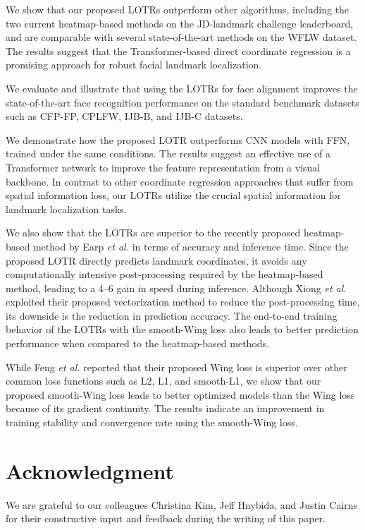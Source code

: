 \documentclass[journal]{IEEEtran}
\begin{document}
We show that our proposed LOTRs outperform other algorithms, including the two current heatmap-based methods on the JD-landmark challenge leaderboard, and are comparable with several state-of-the-art methods on the WFLW dataset.
The results suggest that the Transformer-based direct coordinate regression is a promising approach for robust facial landmark localization.

We evaluate and illustrate that using the LOTRs for face alignment improves the state-of-the-art face recognition performance on the standard benchmark datasets such as CFP-FP, CPLFW, IJB-B, and IJB-C datasets.

We demonstrate how the proposed LOTR outperforms CNN models with FFN, trained under the same conditions. 
The results suggest an effective use of a Transformer network to improve the feature representation from a visual backbone. 
In contrast to other coordinate regression approaches that suffer from spatial information loss, our LOTRs utilize the crucial spatial information for landmark localization tasks.

We also show that the LOTRs are superior to the recently proposed heatmap-based method by Earp \textit{et al.} \cite{earp2021sub} in terms of accuracy and inference time. 
Since the proposed LOTR directly predicts landmark coordinates, it avoids any computationally intensive post-processing required by the heatmap-based method, leading to a 4--6 gain in speed during inference. 
Although Xiong \textit{et al.} \cite{xiong2020} exploited their proposed vectorization method to reduce the post-processing time, its downside is the reduction in prediction accuracy.
The end-to-end training behavior of the LOTRs with the smooth-Wing loss also leads to better prediction performance when compared to the heatmap-based methods.

While Feng \textit{et al.} \cite{Feng2017} reported that their proposed Wing loss is superior over other common loss functions such as L2, L1, and smooth-L1, we show that our proposed smooth-Wing loss leads to better optimized models than the Wing loss because of its gradient continuity. 
The results indicate an improvement in training stability and convergence rate using the smooth-Wing loss. 





\section*{Acknowledgment}

We are grateful to our colleagues Christina Kim, Jeff Hnybida, and Justin Cairns for their constructive input and feedback during the writing of this paper. 



\end{document}
